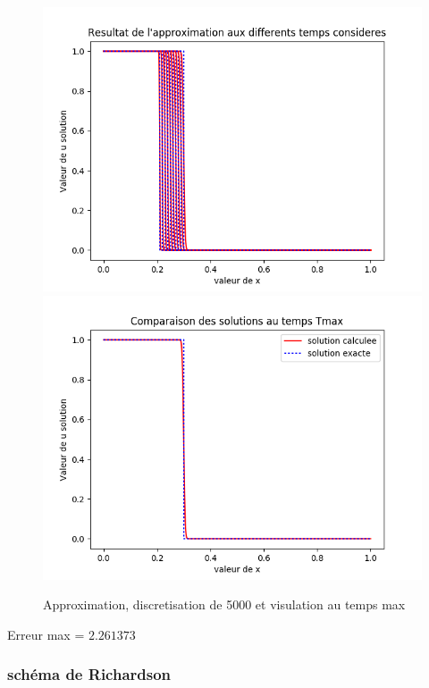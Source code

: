 \documentclass[12pt]{article}
\begin{document}
 \begin{figure}[H]
	\centering
	\includegraphics[scale=0.40]{1D_c1_5000_s1_init3.png}
	\includegraphics[scale=0.40]{Temp_max_c1_5000_s1_i3.png}
	\caption{Approximation, discretisation de 5000 et visulation au temps max}
	\label{1D} 
	\end{figure}
Erreur max = $2.261373$
\subsubsection{schéma de Richardson}
\end{document}
